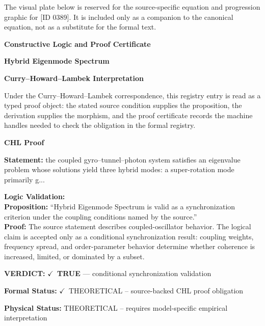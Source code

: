 \begingroup\footnotesize\sloppy
The visual plate below is reserved for the source-specific equation and progression graphic for [ID 0389]. It is included only as a companion to the canonical equation, not as a substitute for the formal text.
\par\endgroup
\ifTZPDarkEdition
{}
\fi

\clearpage
\begingroup\tzpsupportsetup
\noindent\textbf{\fontsize{10.8pt}{12.8pt}\selectfont [ID 0389] Constructive Logic and Proof Certificate}\par
\noindent\textbf{\fontsize{10pt}{12pt}\selectfont Hybrid Eigenmode Spectrum}\par
\vspace{0.45em}
\begingroup
\footnotesize
\setlength{\parskip}{0.22em}
\setlength{\parindent}{0pt}
\noindent\textbf{Curry--Howard--Lambek Interpretation}\par
Under the Curry--Howard--Lambek correspondence, this registry entry is read as a typed proof
object: the stated source condition supplies the proposition, the derivation supplies the
morphism, and the proof certificate records the machine handles needed to check the obligation
in the formal registry.

\vspace{0.45em}
\noindent\textbf{CHL Proof}\par
\textbf{Statement:} the coupled gyro--tunnel--photon system satisfies an eigenvalue problem whose solutions
yield three hybrid modes: a super-rotation mode primarily g...

\textbf{Logic Validation:}\\
\textbf{Proposition:} ``Hybrid Eigenmode Spectrum is valid as a synchronization criterion under the coupling
conditions named by the source.''\\
\textbf{Proof:} The source statement describes coupled-oscillator behavior. The logical claim is
accepted only as a conditional synchronization result: coupling weights, frequency
spread, and order-parameter behavior determine whether coherence is increased, limited,
or dominated by a subset.

\textbf{VERDICT:} \ensuremath{\checkmark}\ \textbf{TRUE} --- conditional synchronization validation

\textbf{Formal Status:} \ensuremath{\checkmark}\ THEORETICAL -- source-backed CHL proof obligation

\textbf{Physical Status:} THEORETICAL -- requires model-specific empirical interpretation
\par\vspace{0.45em}
\par
\ifTZPDarkEdition
{}
\fi
\endgroup
\endgroup
